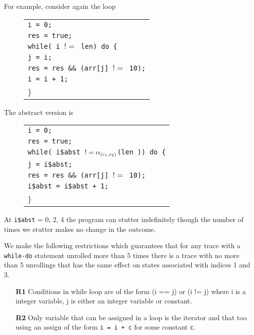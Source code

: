 For example, consider again the loop

\begin{figure}[H]
  \centering
  \begin{tabular}{l}
    {\tt i = 0;} \\
    {\tt res = true;} \\
    {\tt while( i $!=$ len) do \{}  \\
    \hspace{1cm} {\tt j = i;} \\
    \hspace{1cm} {\tt res = res \&\& (arr[j] $!=$ 10);} \\
    \hspace{1cm}  {\tt i = i + 1;} \\
    \}\\
    \end{tabular}
\end{figure}

The abstract version is

\begin{figure}[H]
  \centering
  \begin{tabular}{l}
    {\tt i = 0;} \\
    {\tt res = true;} \\
    {\tt while( i\$abst $!= \alpha_{(c_1,c_2)}$(len )) do \{}  \\
    \hspace{1cm} {\tt j = i\$abst;} \\
    \hspace{1cm} {\tt res = res \&\& (arr[j] $!=$ 10);} \\
    \hspace{1cm}  {\tt i\$abst = i\$abst + 1;} \\
    \}\\
    \end{tabular}
\end{figure}

At {\tt i\$abst} = 0, 2, 4 the program can stutter indefinitely though
the number of times we stutter makes no change in the outcome.

We make the following restrictions which guarantees that for any trace
with a {\tt while-do} statement unrolled more than 5 times there is a
trace with no more than 5 unrollings that has the same effect on
states associated with indices 1 and 3.

\begin{itemize}
\item[{\bf R1}] Conditions in while loop are of the form (i == j) or (i != j) where
i is a integer variable, j is either an integer variable or constant.
\item[{\bf R2}] Only variable that can be assigned in a loop is the iterator
  and that too using an assign of the form {\tt i = i + c} for some
  constant {\tt c}.
\end{itemize}

